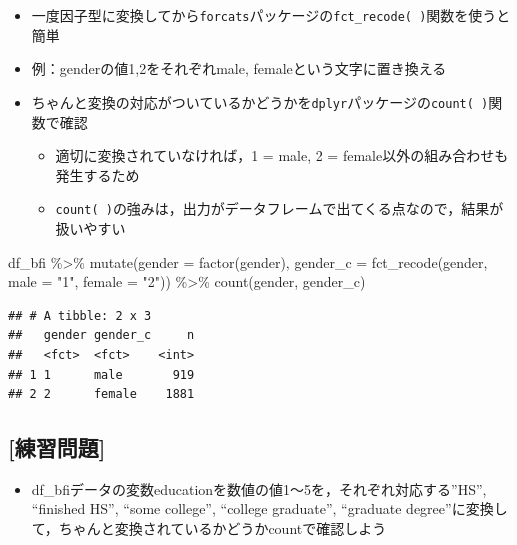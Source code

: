 \documentclass[
  xelatex,ja=standard, b5paper]{bxjsbook}
\newenvironment{Shaded}{\begin{snugshade}}{\end{snugshade}}
\newcommand{\AttributeTok}[1]{\textcolor[rgb]{0.77,0.63,0.00}{#1}}
\newcommand{\FunctionTok}[1]{\textcolor[rgb]{0.00,0.00,0.00}{#1}}
\newcommand{\NormalTok}[1]{#1}
\newcommand{\SpecialCharTok}[1]{\textcolor[rgb]{0.00,0.00,0.00}{#1}}
\newcommand{\StringTok}[1]{\textcolor[rgb]{0.31,0.60,0.02}{#1}}
\providecommand{\tightlist}{%
  \setlength{\itemsep}{0pt}\setlength{\parskip}{0pt}}
\begin{document}
\begin{itemize}
\tightlist
\item
  一度因子型に変換してから\texttt{forcats}パッケージの\texttt{fct\_recode(\ )}関数を使うと簡単
\item
  例：genderの値1,2をそれぞれmale, femaleという文字に置き換える
\item
  ちゃんと変換の対応がついているかどうかを\texttt{dplyr}パッケージの\texttt{count(\ )}関数で確認

  \begin{itemize}
  \tightlist
  \item
    適切に変換されていなければ，1 = male, 2 = female以外の組み合わせも発生するため
  \item
    \texttt{count(\ )}の強みは，出力がデータフレームで出てくる点なので，結果が扱いやすい
  \end{itemize}
\end{itemize}

\begin{Shaded}
\begin{Highlighting}[]
\NormalTok{df\_bfi }\SpecialCharTok{\%\textgreater{}\%}
  \FunctionTok{mutate}\NormalTok{(}\AttributeTok{gender =} \FunctionTok{factor}\NormalTok{(gender),}
         \AttributeTok{gender\_c =} \FunctionTok{fct\_recode}\NormalTok{(gender, }
                               \AttributeTok{male   =} \StringTok{"1"}\NormalTok{,}
                               \AttributeTok{female =} \StringTok{"2"}\NormalTok{)) }\SpecialCharTok{\%\textgreater{}\%} 
  \FunctionTok{count}\NormalTok{(gender, gender\_c)}
\end{Highlighting}
\end{Shaded}

\begin{verbatim}
## # A tibble: 2 x 3
##   gender gender_c     n
##   <fct>  <fct>    <int>
## 1 1      male       919
## 2 2      female    1881
\end{verbatim}

\hypertarget{ux7df4ux7fd2ux554fux984c-12}{%
\subsection{{[}練習問題{]}}\label{ux7df4ux7fd2ux554fux984c-12}}

\begin{itemize}
\tightlist
\item
  df\_bfiデータの変数educationを数値の値1～5を，それぞれ対応する''HS'', ``finished HS'', ``some college'', ``college graduate'', ``graduate degree''に変換して，ちゃんと変換されているかどうかcountで確認しよう
\end{itemize}
\end{document}
